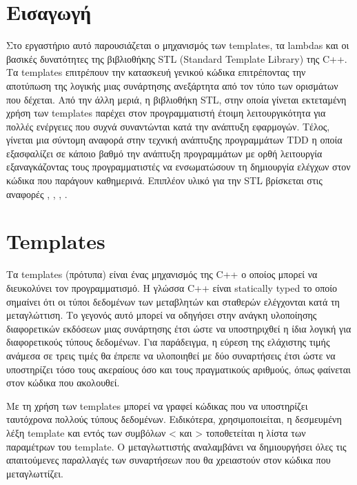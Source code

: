 \section{Εισαγωγή}
Στο εργαστήριο αυτό παρουσιάζεται ο μηχανισμός των templates, τα lambdas και οι βασικές δυνατότητες της βιβλιοθήκης STL (Standard Template Library) της C++. Τα templates επιτρέπουν την κατασκευή γενικού κώδικα επιτρέποντας την αποτύπωση της λογικής μιας συνάρτησης ανεξάρτητα από τον τύπο των ορισμάτων που δέχεται. Από την άλλη μεριά, η βιβλιοθήκη STL, στην οποία γίνεται εκτεταμένη χρήση των templates παρέχει στον προγραμματιστή έτοιμη λειτουργικότητα για πολλές ενέργειες που συχνά συναντώνται κατά την ανάπτυξη εφαρμογών. Τέλος, γίνεται μια σύντομη αναφορά στην τεχνική ανάπτυξης προγραμμάτων TDD η οποία εξασφαλίζει σε κάποιο βαθμό την ανάπτυξη προγραμμάτων με ορθή λειτουργία εξαναγκάζοντας τους προγραμματιστές να ενσωματώσουν τη δημιουργία ελέγχων στον κώδικα που παράγουν καθημερινά. Επιπλέον υλικό για την STL βρίσκεται στις αναφορές \cite{geeks4geeks_stl}, \cite{topcoder_stl1}, \cite{topcoder_stl2}, \cite{hackerearth_stl}. 


\section{Templates}
Τα templates (πρότυπα) είναι ένας μηχανισμός της C++ ο οποίος μπορεί να διευκολύνει τον προγραμματισμό. Η γλώσσα C++ είναι statically typed το οποίο σημαίνει ότι οι τύποι δεδομένων των μεταβλητών και σταθερών ελέγχονται κατά τη μεταγλώττιση. Το γεγονός αυτό μπορεί να οδηγήσει στην ανάγκη υλοποίησης διαφορετικών εκδόσεων μιας συνάρτησης έτσι ώστε να υποστηριχθεί η ίδια λογική για διαφορετικούς τύπους δεδομένων. Για παράδειγμα, η εύρεση της ελάχιστης τιμής ανάμεσα σε τρεις τιμές θα έπρεπε να υλοποιηθεί με δύο συναρτήσεις έτσι ώστε να υποστηρίζει τόσο τους ακεραίους όσο και τους πραγματικούς αριθμούς, όπως φαίνεται στον κώδικα που ακολουθεί.





Με τη χρήση των templates μπορεί να γραφεί κώδικας που να υποστηρίζει ταυτόχρονα πολλούς τύπους δεδομένων.  Ειδικότερα, χρησιμοποιείται, η δεσμευμένη λέξη template και εντός των συμβόλων < και > τοποθετείται η λίστα των παραμέτρων του template. Ο μεταγλωττιστής αναλαμβάνει να δημιουργήσει όλες τις απαιτούμενες παραλλαγές των συναρτήσεων που θα χρειαστούν στον κώδικα που μεταγλωττίζει.

